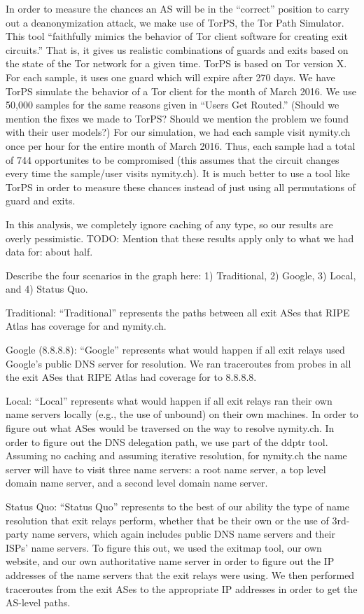 In order to measure the chances an AS will be in the ``correct'' position to carry out a
deanonymization attack, we make use of TorPS, the Tor Path Simulator. This tool 
``faithfully mimics the behavior of Tor client software for creating exit circuits.''
That is, it gives us realistic combinations of guards and exits based on the state of the 
Tor network for a given time. TorPS is based on Tor version X. For each sample, it uses 
one guard which will expire after 270 days. We have TorPS simulate the behavior of a Tor 
client for the month of March 2016. We use 50,000 samples for the same reasons given in
``Users Get Routed.'' (Should we mention the fixes we made to TorPS? Should we mention 
the problem we found with their user models?) For our simulation, we had each sample 
visit nymity.ch once per hour for the entire month of March 2016. Thus, each sample had 
a total of 744 opportunites to be compromised (this assumes that the circuit changes 
every time the sample/user visits nymity.ch). It is much better to use a tool like TorPS 
in order to measure these chances instead of just using all permutations of guard and 
exits.

In this analysis, we completely ignore caching of any type, so our results are overly 
pessimistic. TODO: Mention that these results apply only to what we had data for: about 
half.

Describe the four scenarios in the graph here: 1) Traditional, 2) Google, 3) Local, and 
4) Status Quo.

Traditional: ``Traditional'' represents the paths between all exit ASes that RIPE Atlas 
has coverage for and nymity.ch. 

Google (8.8.8.8): ``Google'' represents what would happen if all exit relays used 
Google's public DNS server for resolution. We ran traceroutes from probes in all the exit 
ASes that RIPE Atlas had coverage for to 8.8.8.8.

Local: ``Local'' represents what would happen if all exit relays ran their own name 
servers locally (e.g., the use of unbound) on their own machines. In order to figure out 
what ASes would be traversed on the way to resolve nymity.ch. In order to figure out the 
DNS delegation path, we use part of the ddptr tool. Assuming no caching and assuming 
iterative resolution, for nymity.ch the name server will have to visit three name servers:
a root name server, a top level domain name server, and a second level domain name server. 

Status Quo: ``Status Quo'' represents to the best of our ability the type of name resolution 
that exit relays perform, whether that be their own or the use of 3rd-party name servers, 
which again includes public DNS name servers and their ISPs' name servers. To figure this 
out, we used the exitmap tool, our own website, and our own authoritative name server 
in order to figure out the IP addresses of the name servers that the exit relays were 
using. We then performed traceroutes from the exit ASes to the appropriate IP addresses 
in order to get the AS-level paths.

